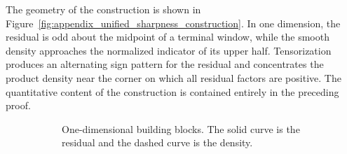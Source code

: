\documentclass[11pt,letterpaper]{article}
\theoremstyle{definition}
\theoremstyle{remark}
\begin{document}
The geometry of the construction is shown in
Figure~\ref{fig:appendix_unified_sharpness_construction}. In one dimension,
the residual is odd about the midpoint of a terminal window, while the smooth
density approaches the normalized indicator of its upper half. Tensorization
produces an alternating sign pattern for the residual and concentrates the
product density near the corner on which all residual factors are positive.
The quantitative content of the construction is contained entirely in the
preceding proof.

\begin{figure}[t]
\centering

\begin{subfigure}[t]{0.43\textwidth}
\centering
{}
\caption{One-dimensional building blocks. The solid curve is the residual and
the dashed curve is the density.}
\label{fig:appendix_unified_sharpness_1d}
\end{subfigure}
\hfill
\begin{subfigure}[t]{0.49\textwidth}
\centering
{}
\end{subfigure}
\end{figure}
\end{document}
